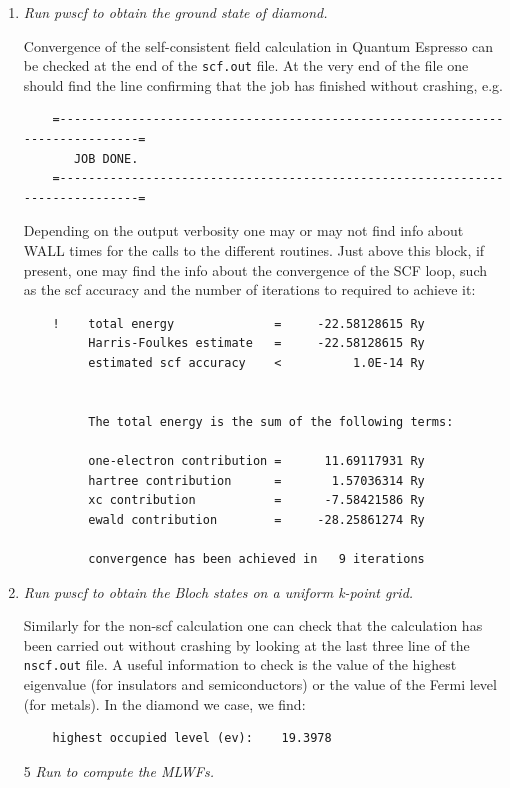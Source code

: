 \begin{enumerate}
	\item {\it Run pwscf to obtain the ground state of diamond.}

	Convergence of the self-consistent field calculation in Quantum Espresso can be checked at the end of the {\tt scf.out} file. At the very end of the file one should find the line confirming that the job has finished without crashing, e.g.
	\begin{tcolorbox}[sharp corners,boxrule=0.5pt]
	{\small
	\begin{verbatim}
	=------------------------------------------------------------------------------=
	   JOB DONE.
	=------------------------------------------------------------------------------=
	\end{verbatim}
	}
	\end{tcolorbox}
	Depending on the output verbosity one may or may not find info about WALL times for the calls to the different routines. Just above this block, if present, one may find the info about the convergence of the SCF loop, such as the scf accuracy and the number of iterations to required to achieve it:  
	\begin{tcolorbox}[sharp corners,boxrule=0.5pt]
	\small{
	\begin{verbatim}
    !    total energy              =     -22.58128615 Ry
         Harris-Foulkes estimate   =     -22.58128615 Ry
         estimated scf accuracy    <          1.0E-14 Ry


         The total energy is the sum of the following terms:

         one-electron contribution =      11.69117931 Ry
         hartree contribution      =       1.57036314 Ry
         xc contribution           =      -7.58421586 Ry
         ewald contribution        =     -28.25861274 Ry

         convergence has been achieved in   9 iterations
	\end{verbatim}
	}
	\end{tcolorbox}
	\item {\it Run pwscf to obtain the Bloch states on a uniform k-point grid.}

	Similarly for the non-scf calculation one can check that the calculation has been carried out without crashing by looking at the last three line of the {\tt nscf.out} file. A useful information to check is the value of the highest eigenvalue (for insulators and semiconductors) or the value of the Fermi level (for metals). In the diamond we case, we find:
	\begin{tcolorbox}[sharp corners,boxrule=0.5pt]
	{\small
	\begin{verbatim}
	highest occupied level (ev):    19.3978
	\end{verbatim}
	}
	\end{tcolorbox}
	\item[5] {\it Run \Wannier{} to compute the MLWFs.}


\end{enumerate}
